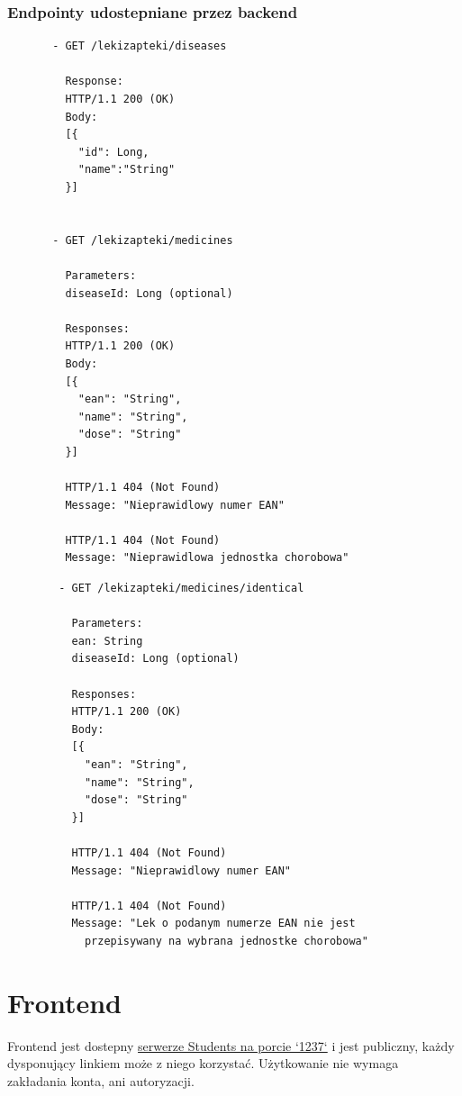 \documentclass{article}
\begin{document}
    \subsubsection{Endpointy udostepniane przez backend}
    \noindent
    \begin{minipage}{.45\textwidth}
     \begin{lstlisting}
       - GET /lekizapteki/diseases

         Response:
         HTTP/1.1 200 (OK)
         Body:
         [{
           "id": Long,
           "name":"String"
         }]


       - GET /lekizapteki/medicines

         Parameters:
         diseaseId: Long (optional)

         Responses:
         HTTP/1.1 200 (OK)
         Body:
         [{
           "ean": "String",
           "name": "String",
           "dose": "String"
         }]

         HTTP/1.1 404 (Not Found)
         Message: "Nieprawidlowy numer EAN"

         HTTP/1.1 404 (Not Found)
         Message: "Nieprawidlowa jednostka chorobowa"
     \end{lstlisting}
    \end{minipage}\hfill
    \begin{minipage}{.45\textwidth}
      \begin{lstlisting}
        - GET /lekizapteki/medicines/identical

          Parameters:
          ean: String
          diseaseId: Long (optional)

          Responses:
          HTTP/1.1 200 (OK)
          Body:
          [{
            "ean": "String",
            "name": "String",
            "dose": "String"
          }]

          HTTP/1.1 404 (Not Found)
          Message: "Nieprawidlowy numer EAN"

          HTTP/1.1 404 (Not Found)
          Message: "Lek o podanym numerze EAN nie jest
            przepisywany na wybrana jednostke chorobowa"
      \end{lstlisting}
    \end{minipage}

  \section{Frontend}
  Frontend jest dostepny
  \href{http://students.mimuw.edu.pl:1237}{serwerze Students na porcie `1237`} i jest publiczny,
  każdy dysponujący linkiem może z niego korzystać.
  Użytkowanie nie wymaga zakładania konta, ani autoryzacji.
\end{document}
